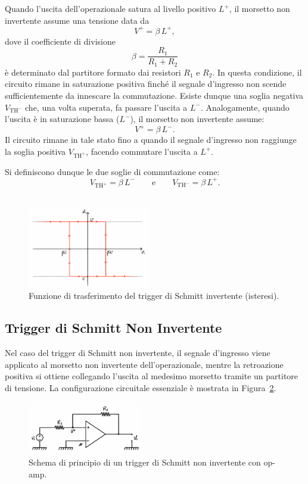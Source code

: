 Quando l'uscita dell'operazionale satura al livello positivo \(L^+\), il morsetto non invertente assume una tensione data da
\[
V^+ = \beta\, L^+,
\]
dove il coefficiente di divisione
\[
\beta = \frac{R_1}{R_1 + R_2}
\]
è determinato dal partitore formato dai resistori \( R_1 \) e \( R_2 \). In questa condizione, il circuito rimane in saturazione positiva finché il segnale d’ingresso non scende sufficientemente da innescare la commutazione. Esiste dunque una soglia negativa \(V_{\text{TH}^-}\) che, una volta superata, fa passare l’uscita a \(L^-\). Analogamente, quando l'uscita è in saturazione bassa (\(L^-\)), il morsetto non invertente assume:
\[
V^+ = \beta\, L^-.
\]
Il circuito rimane in tale stato fino a quando il segnale d’ingresso non raggiunge la soglia positiva \(V_{\text{TH}^+}\), facendo commutare l'uscita a \(L^+\).

Si definiscono dunque le due soglie di commutazione come:
\[
V_{\text{TH}^+} = \beta\,L^- \qquad \text{e} \qquad V_{\text{TH}^-} = \beta\,L^+.
\]
\\[2mm]
\begin{figure}[H]
  \centering
  \includegraphics[width=0.48\textwidth]{images/1.6.3.2.png}
  \caption{Funzione di trasferimento del trigger di Schmitt invertente (isteresi).}
  \label{fig:schmitt_invertente_tf}
\end{figure}
\newpage

\subsection{Trigger di Schmitt Non Invertente}

Nel caso del trigger di Schmitt non invertente, il segnale d’ingresso viene applicato al morsetto non invertente dell’operazionale, mentre la retroazione positiva si ottiene collegando l’uscita al medesimo morsetto tramite un partitore di tensione. La configurazione circuitale essenziale è mostrata in Figura~\ref{fig:schmitt_non_invertente}.\\[2mm]
\begin{figure}[H]
  \centering
  \includegraphics[width=0.45\textwidth]{images/1.6.4.1.png}
  \caption{Schema di principio di un trigger di Schmitt non invertente con op-amp.}
  \label{fig:schmitt_non_invertente}
\end{figure}

